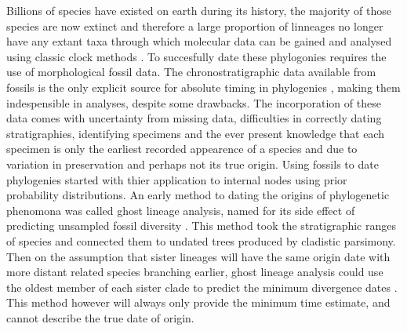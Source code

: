 \documentclass[11pt,letterpaper]{article}
\begin{document}
Billions of species have existed on earth during its history, the majority of those species are now extinct and therefore a large proportion of linneages no longer have any extant taxa through which molecular data can be gained and analysed using classic clock methods \citep{turner2017empirical}. To succesfully date these phylogonies requires the  use of morphological fossil data. The chronostratigraphic data available from fossils is the only explicit source for absolute timing in phylogenies \citep{turner2017empirical}, making them indespensible in analyses, despite some drawbacks. The incorporation of these data comes with uncertainty from missing data, difficulties in correctly dating stratigraphies, identifying specimens and the ever present knowledge that each specimen is only the earliest recorded appearence of a species and due to variation in preservation and perhaps not its true origin. Using fossils to date phylogenies started with thier application to internal nodes using prior probability distributions. An early method to dating the origins of phylogenetic phenomona was called ghost lineage analysis, named for its side effect of predicting unsampled fossil diversity \citep{norell1992taxic}. This method took the stratigraphic ranges of species and connected them to undated trees produced by cladistic parsimony. Then on the assumption that sister lineages will have the same origin date with more distant related species branching earlier, ghost lineage analysis could use the oldest member of each sister clade to predict the minimum divergence dates \citep{norell1992taxic}. This method however will always only provide the minimum time estimate, and cannot describe the true date of origin. 
\end{document}
